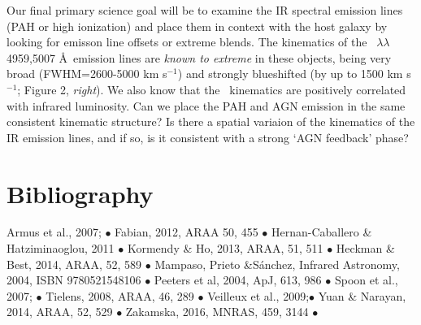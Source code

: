 \smallskip \smallskip
\noindent 
Our final primary science goal will be to examine the IR spectral
emission lines (PAH or high ionization) and place them in context with
the host galaxy by looking for emisson line offsets or extreme blends.
The kinematics of the \oiii\ $\lambda \lambda$4959,5007 \AA\ emission
lines are {\it known to extreme} in these objects, being very broad
(FWHM=2600-5000 km s$^{-1}$) and strongly blueshifted (by up to 1500
km s$^{-1}$; Figure 2, {\it right}). We also know that the \oiii\
kinematics are positively correlated with infrared luminosity.  Can we
place the PAH and AGN emission in the same consistent kinematic
structure?  Is there a spatial variaion of the kinematics of the IR
emission lines, and if so, is it consistent with a strong `AGN
feedback' phase?

\section*{Bibliography}
Armus et al., 2007; $\bullet$
Fabian, 2012, ARAA 50, 455 $\bullet$ 
Hernan-Caballero \& Hatziminaoglou, 2011 $\bullet$
Kormendy \& Ho, 2013, ARAA, 51, 511 $\bullet$
Heckman \& Best, 2014, ARAA, 52, 589  $\bullet$
Mampaso, Prieto \&Sánchez, Infrared Astronomy, 2004, ISBN  9780521548106 $\bullet$
Peeters et al, 2004, ApJ, 613, 986 $\bullet$
Spoon et al., 2007; $\bullet$
Tielens, 2008, ARAA, 46, 289  $\bullet$
Veilleux et al., 2009;$\bullet$
Yuan \& Narayan, 2014, ARAA, 52, 529 $\bullet$
Zakamska, 2016, MNRAS, 459, 3144 $\bullet$
\medskip \medskip \medskip \medskip


